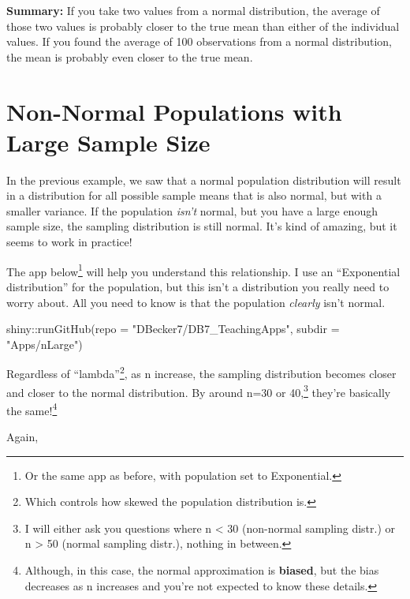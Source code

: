 \documentclass[
  letterpaper,
  DIV=11,
  numbers=noendperiod]{scrreprt}
\newenvironment{Shaded}{\begin{snugshade}}{\end{snugshade}}
\newcommand{\AttributeTok}[1]{\textcolor[rgb]{0.40,0.45,0.13}{#1}}
\newcommand{\FunctionTok}[1]{\textcolor[rgb]{0.28,0.35,0.67}{#1}}
\newcommand{\NormalTok}[1]{\textcolor[rgb]{0.00,0.23,0.31}{#1}}
\newcommand{\SpecialCharTok}[1]{\textcolor[rgb]{0.37,0.37,0.37}{#1}}
\newcommand{\StringTok}[1]{\textcolor[rgb]{0.13,0.47,0.30}{#1}}
\begin{document}
\textbf{Summary:} If you take two values from a normal distribution, the
average of those two values is probably closer to the true mean than
either of the individual values. If you found the average of 100
observations from a normal distribution, the mean is probably even
closer to the true mean.

\hypertarget{non-normal-populations-with-large-sample-size}{%
\chapter{Non-Normal Populations with Large Sample
Size}\label{non-normal-populations-with-large-sample-size}}

In the previous example, we saw that a normal population distribution
will result in a distribution for all possible sample means that is also
normal, but with a smaller variance. If the population \emph{isn't}
normal, but you have a large enough sample size, the sampling
distribution is still normal. It's kind of amazing, but it seems to work
in practice!

The app below\footnote{Or the same app as before, with population set to
  Exponential.} will help you understand this relationship. I use an
``Exponential distribution'' for the population, but this isn't a
distribution you really need to worry about. All you need to know is
that the population \emph{clearly} isn't normal.

\begin{Shaded}
\begin{Highlighting}[]
\NormalTok{shiny}\SpecialCharTok{::}\FunctionTok{runGitHub}\NormalTok{(}\AttributeTok{repo =} \StringTok{"DBecker7/DB7\_TeachingApps"}\NormalTok{, }
    \AttributeTok{subdir =} \StringTok{"Apps/nLarge"}\NormalTok{)}
\end{Highlighting}
\end{Shaded}

Regardless of ``lambda''\footnote{Which controls how skewed the
  population distribution is.}, as n increase, the sampling distribution
becomes closer and closer to the normal distribution. By around n=30 or
40,\footnote{I will either ask you questions where n \textless{} 30
  (non-normal sampling distr.) or n \textgreater{} 50 (normal sampling
  distr.), nothing in between.} they're basically the same!\footnote{Although,
  in this case, the normal approximation is \textbf{biased}, but the
  bias decreases as n increases and you're not expected to know these
  details.}

Again,
\end{document}
